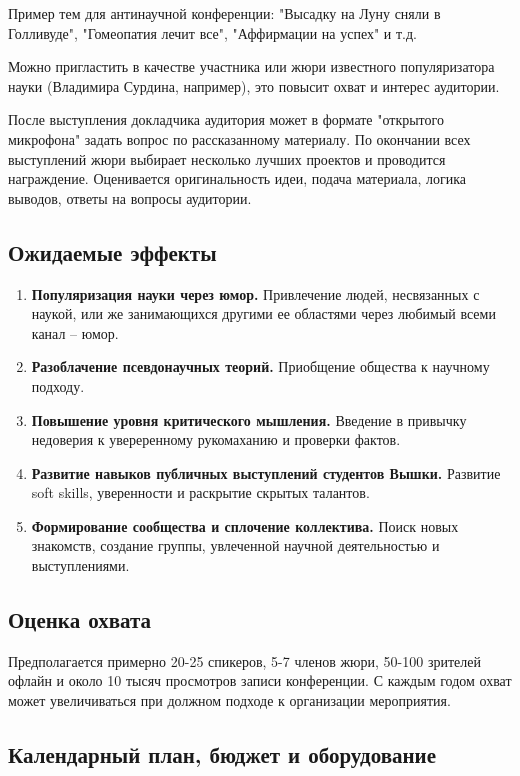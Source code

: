 \documentclass[12pt]{article}
\begin{document}
Пример тем для антинаучной конференции: "Высадку на Луну сняли в Голливуде", "Гомеопатия лечит все", "Аффирмации на успех" и т.д.

Можно пригластить в качестве участника или жюри известного популяризатора науки (Владимира Сурдина, например), это повысит охват и интерес аудитории.

После выступления докладчика аудитория может в формате "открытого микрофона" задать вопрос по рассказанному материалу. По окончании всех выступлений жюри выбирает несколько лучших проектов и проводится награждение. Оценивается оригинальность идеи, подача материала, логика выводов, ответы на вопросы аудитории.
\subsection*{Ожидаемые эффекты}
\begin{enumerate}
    \item \textbf{Популяризация науки через юмор.} Привлечение людей, несвязанных с наукой, или же занимающихся другими ее областями через любимый всеми канал -- юмор.
    \item \textbf{Разоблачение псевдонаучных теорий.} Приобщение общества к научному подходу.
    \item \textbf{Повышение уровня критического мышления.} Введение в привычку недоверия к увереренному рукомаханию и проверки фактов.
    \item \textbf{Развитие навыков публичных выступлений студентов Вышки.} Развитие soft skills, уверенности и раскрытие скрытых талантов.
    \item \textbf{Формирование сообщества и сплочение коллектива.} Поиск новых знакомств, создание группы, увлеченной научной деятельностью и выступлениями.
\end{enumerate}
\subsection*{Оценка охвата}
Предполагается примерно 20-25 спикеров, 5-7 членов жюри, 50-100 зрителей офлайн и около 10 тысяч просмотров записи конференции. С каждым годом охват может увеличиваться при должном подходе к организации мероприятия.
\subsection*{Календарный план, бюджет и оборудование}
\end{document}
